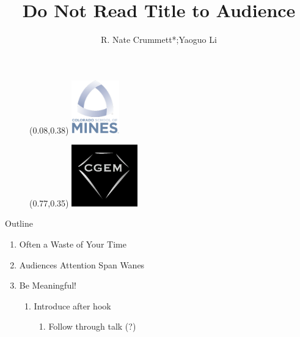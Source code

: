 \documentclass[dark]{cgem-presentation}
\title{Do Not Read Title to Audience}
\author{R. Nate Crummett*;Yaoguo Li}
\begin{document}
  \begin{frame}[plain]
    \begin{figure}
      \begin{textblock*}{2.05cm}(0.08\paperwidth,0.38\paperheight)
        \includegraphics[width=2.05cm]{mines-2018}
      \end{textblock*}
    \end{figure}
    \begin{figure}
      \begin{textblock*}{2.85cm}(0.77\paperwidth,0.35\paperheight)
        \includegraphics[width=2.85cm]{cgem-logo}
      \end{textblock*}
    \end{figure}
    \maketitle{1cm}{1.2cm}{2mm}{-5mm}
  \end{frame}

  \begin{frame}{Outline}
    \begin{enumerate}
      \item Often a Waste of Your Time
      \item Audiences Attention Span Wanes
      \item Be Meaningful! \\[1mm]
      \begin{enumerate}
        \item Introduce after hook \\[2mm]
        \begin{enumerate}
          \item Follow through talk (?)
        \end{enumerate}
      \end{enumerate}
    \end{enumerate}
  \end{frame}
 
\end{document}
